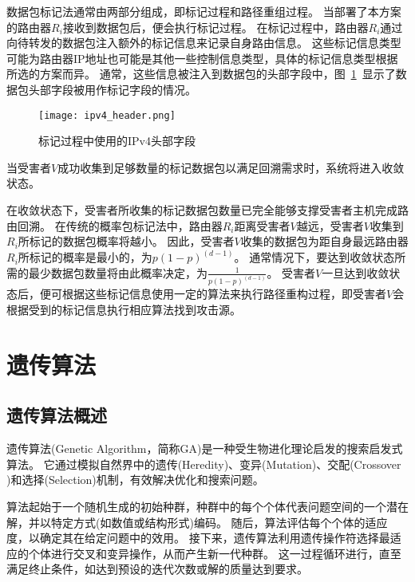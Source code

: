 数据包标记法通常由两部分组成，即标记过程和路径重组过程。
当部署了本方案的路由器$R_i$接收到数据包后，便会执行标记过程。
在标记过程中，路由器$R_i$通过向待转发的数据包注入额外的标记信息来记录自身路由信息。
这些标记信息类型可能为路由器IP地址也可能是其他一些控制信息类型，具体的标记信息类型根据所选的方案而异。
通常，这些信息被注入到数据包的头部字段中，图~\ref{fig:ipv4_header}~显示了数据包头部字段被用作标记字段的情况。
\begin{figure}[htbp]
  \centering
  \texttt{[image: ipv4\_header.png]}
  \caption{标记过程中使用的IPv4头部字段}
  \label{fig:ipv4_header}
\end{figure}
当受害者$V$成功收集到足够数量的标记数据包以满足回溯需求时，系统将进入收敛状态。



在收敛状态下，受害者所收集的标记数据包数量已完全能够支撑受害者主机完成路由回溯。
在传统的概率包标记法中，路由器$R_i$距离受害者$V$越远，受害者$V$收集到$R_i$所标记的数据包概率将越小。
因此，受害者$V$收集的数据包为距自身最远路由器$R_i$所标记的概率是最小的，为$p(1-p)^(d-1)$。
通常情况下，要达到收敛状态所需的最少数据包数量将由此概率决定，为$\frac{1}{p(1-p)^(d-1)}$。
受害者$V$一旦达到收敛状态后，便可根据这些标记信息使用一定的算法来执行路径重构过程，即受害者$V$会根据受到的标记信息执行相应算法找到攻击源。

\section{遗传算法}
\label{sec:GA}
\subsection{遗传算法概述}
遗传算法(Genetic Algorithm，简称GA)\cite{alhijawi2023genetic,gen2023genetic}是一种受生物进化理论启发的搜索启发式算法。
它通过模拟自然界中的遗传(Heredity)、变异(Mutation)、交配(Crossover )和选择(Selection)机制，有效解决优化和搜索问题。\par

算法起始于一个随机生成的初始种群，种群中的每个个体代表问题空间的一个潜在解，并以特定方式(如数值或结构形式)编码。
随后，算法评估每个个体的适应度，以确定其在给定问题中的效用。
接下来，遗传算法利用遗传操作符选择最适应的个体进行交叉和变异操作，从而产生新一代种群。
这一过程循环进行，直至满足终止条件，如达到预设的迭代次数或解的质量达到要求。

